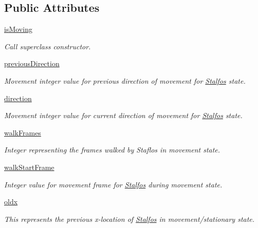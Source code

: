 \subsection*{Public Attributes}
\begin{DoxyCompactItemize}
\item 
\hyperlink{classactor_1_1stalfos_1_1_stalfos_a75c99c163e71b951ea617a47e2ed1dda}{is\+Moving}
\begin{DoxyCompactList}\small\item\em Call superclass constructor. \end{DoxyCompactList}\item 
\hyperlink{classactor_1_1stalfos_1_1_stalfos_a7e91c289f586728284c20c3963b86b06}{previous\+Direction}
\begin{DoxyCompactList}\small\item\em Movement integer value for previous direction of movement for \hyperlink{classactor_1_1stalfos_1_1_stalfos}{Stalfos} state. \end{DoxyCompactList}\item 
\hyperlink{classactor_1_1stalfos_1_1_stalfos_ae98d09367d88672074d0ae4622b03eda}{direction}
\begin{DoxyCompactList}\small\item\em Movement integer value for current direction of movement for \hyperlink{classactor_1_1stalfos_1_1_stalfos}{Stalfos} state. \end{DoxyCompactList}\item 
\hyperlink{classactor_1_1stalfos_1_1_stalfos_ae583478be5ec05f00f4f3fb460516012}{walk\+Frames}
\begin{DoxyCompactList}\small\item\em Integer representing the frames walked by Staflos in movement state. \end{DoxyCompactList}\item 
\hyperlink{classactor_1_1stalfos_1_1_stalfos_ac0fcfca44d7cc2642a4116806bb6b1b6}{walk\+Start\+Frame}
\begin{DoxyCompactList}\small\item\em Integer value for movement frame for \hyperlink{classactor_1_1stalfos_1_1_stalfos}{Stalfos} during movement state. \end{DoxyCompactList}\item 
\hyperlink{classactor_1_1stalfos_1_1_stalfos_ae5e4aa1e1b15ec9e23b59e73584bd474}{oldx}
\begin{DoxyCompactList}\small\item\em This represents the previous x-\/location of \hyperlink{classactor_1_1stalfos_1_1_stalfos}{Stalfos} in movement/stationary state. \end{DoxyCompactList}\item 

\end{DoxyCompactItemize}

